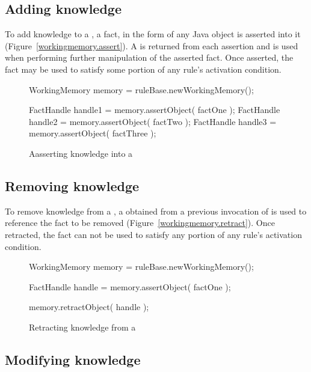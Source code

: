 \subsection{Adding knowledge}

To add knowledge to a , a fact, in the form of
any Java object is asserted into it
(Figure~\vref{workingmemory.assert}).  A  is
returned from each assertion and is used when performing further
manipulation of the asserted fact.  Once asserted, the fact may be
used to satisfy some portion of any rule's activation condition.

\begin{figure}
\begin{javaCodelisting}
WorkingMemory memory = ruleBase.newWorkingMemory();

FactHandle handle1 = memory.assertObject( factOne );
FactHandle handle2 = memory.assertObject( factTwo );
FactHandle handle3 = memory.assertObject( factThree );
\end{javaCodelisting}
\caption{Aasserting knowledge into a }
\label{workingmemory.assert}
\end{figure}

\subsection{Removing knowledge}

To remove knowledge from a , a
 obtained from a previous invocation of
 is used to reference
the fact to be removed (Figure~\vref{workingmemory.retract}).
Once retracted, the fact can not be used to satisfy any portion
of any rule's activation condition.

\begin{figure}
\begin{javaCodelisting}
WorkingMemory memory = ruleBase.newWorkingMemory();

FactHandle handle = memory.assertObject( factOne );

memory.retractObject( handle );
\end{javaCodelisting}
\caption{Retracting knowledge from a }
\label{workingmemory.retract}
\end{figure}

\subsection{Modifying knowledge}

